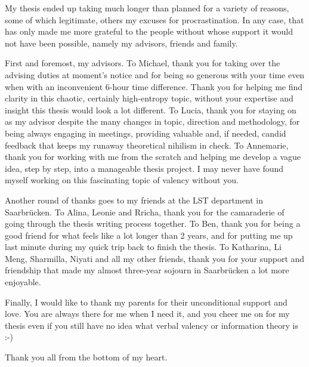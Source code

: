 
My thesis ended up taking much longer than planned for a variety of reasons, some of which legitimate, others my excuses for procrastination. In any case, that has only made me more grateful to the people without whose support it would not have been possible, namely my advisors, friends and family.

First and foremost, my advisors. To Michael, thank you for taking over the advising duties at moment's notice and for being so generous with your time even when with an inconvenient 6-hour time difference. Thank you for helping me find clarity in this chaotic, certainly high-entropy topic, without your expertise and insight this thesis would look a lot different. To Lucia, thank you for staying on as my advisor despite the many changes in topic, direction and methodology, for being always engaging in meetings, providing valuable and, if needed, candid feedback that keeps my runaway theoretical nihilism in check. To Annemarie, thank you for working with me from the scratch and helping me develop a vague idea, step by step, into a manageable thesis project. I may never have found myself working on this fascinating topic of valency without you.

Another round of thanks goes to my friends at the LST department in Saarbrücken. To Alina, Leonie and Rricha, thank you for the camaraderie of going through the thesis writing process together. To Ben, thank you for being a good friend for what feels like a lot longer than 2 years, and for putting me up last minute during my quick trip back to finish the thesis. To Katharina, Li Meng, Sharmilla, Niyati and all my other friends, thank you for your support and friendship that made my almost three-year sojourn in Saarbrücken a lot more enjoyable.

Finally, I would like to thank my parents for their unconditional support and love. You are always there for me when I need it, and you cheer me on for my thesis even if you still have no idea what verbal valency or information theory is :-)

Thank you all from the bottom of my heart.

